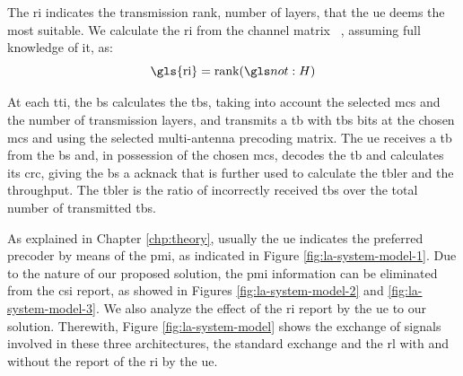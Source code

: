 The \gls{ri} indicates the transmission rank, number of layers, that the \gls{ue} deems the most suitable.
%
We calculate the \gls{ri} from the channel matrix \channel~, assuming full knowledge of it, as:
%
\begin{equation}\label{eq:la-rank}
    \textrm{\gls{ri}} = \textrm{rank} (\channel)
\end{equation}


At each \gls{tti}, the \gls{bs} calculates the \gls{tbs}, taking into account the selected \gls{mcs} and the number of transmission layers, and transmits a \gls{tb} with \gls{tbs} bits at the chosen \gls{mcs} and using the selected multi-antenna precoding matrix.
%
The \gls{ue} receives a \gls{tb} from the \gls{bs} and, in possession of the chosen \gls{mcs}, decodes the \gls{tb} and calculates its \gls{crc}, giving the \gls{bs} a \gls{acknack} that is further used to calculate the \gls{tbler} and the throughput.
%
The \gls{tbler} is the ratio of incorrectly received \gls{tb}s over the total number of transmitted \gls{tb}s.
%
%

As explained in Chapter \ref{chp:theory}, usually the \gls{ue} indicates the preferred precoder by means of the \gls{pmi}, as indicated in Figure \ref{fig:la-system-model-1}.
%
Due to the nature of our proposed solution, the \gls{pmi} information can be eliminated from the \gls{csi} report, as showed in Figures \ref{fig:la-system-model-2} and \ref{fig:la-system-model-3}.
%
We also analyze the effect of the \gls{ri} report by the \gls{ue} to our solution.
%
Therewith, Figure \ref{fig:la-system-model} shows the exchange of signals involved in these three architectures, the standard exchange and the \gls{rl} with and without the report of the \gls{ri} by the \gls{ue}.

